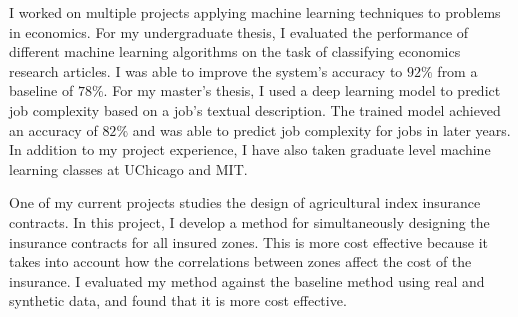 \documentclass[12pt]{article}
\begin{document}

I worked on multiple projects applying machine learning techniques to problems in economics. For my undergraduate thesis, I evaluated the performance of different machine learning algorithms on the task of classifying economics research articles. I was able to improve the system's accuracy to $92\%$ from a baseline of $78\%$. For my master's thesis, I used a deep learning model to predict job complexity based on a job's textual description. The trained model achieved an accuracy of $82\%$ and was able to predict job complexity for jobs in later years. In addition to my project experience, I have also taken graduate level machine learning classes at UChicago and MIT. 


One of my current projects studies the design of agricultural index insurance contracts. In this project, I develop a method for simultaneously designing the insurance contracts for all insured zones. This is more cost effective because it takes into account how the correlations between zones affect the cost of the insurance. I evaluated my method against the baseline method using real and synthetic data, and found that it is more cost effective.
\end{document}

